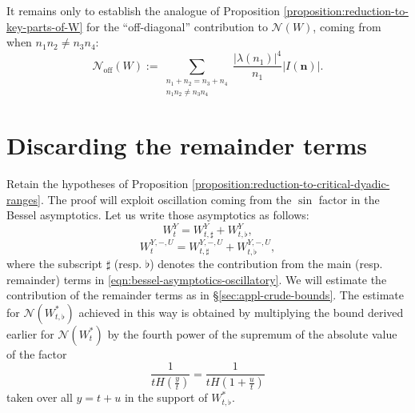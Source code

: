 \documentclass[reqno]{amsart} 
\begin{document}
It remains only to establish the analogue of Proposition \ref{proposition:reduction-to-key-parts-of-W} for the ``off-diagonal'' contribution to $\mathcal{N}(W)$, coming from when $n_1 n_2 \neq n_3 n_4$:
\begin{equation}\label{eqn:definition-N-off}
  \mathcal{N}_{\mathrm{off}}(W) := \sum _{
    \substack{
      n_1 + n_2 = n_3 + n_4  \\
      n_1 n_2 \neq n_3 n_4      
    }
  }
  \frac{\left\lvert \lambda (n _1 ) \right\rvert ^4 }{ n _1 } \left\lvert I(\mathbf{n}) \right\rvert.
\end{equation}



\section{Discarding the remainder terms}\label{sec:discarding-remainder-terms}
Retain the hypotheses of Proposition \ref{proposition:reduction-to-critical-dyadic-ranges}.  The proof will exploit oscillation coming from the $\sin$ factor in the Bessel asymptotics.  Let us write those asymptotics as follows:
\begin{equation*}
  W _t ^Y = W _{t,\sharp}^Y + W _{t,\flat}^Y,
\end{equation*}
\begin{equation*}
  W _t ^{Y, -, U} = W _{t, \sharp } ^{Y, -, U} + W _{t, \flat } ^{Y, -, U},
\end{equation*}
where the subscript $\sharp$ (resp. $\flat$) denotes the contribution from the main (resp. remainder) terms in \eqref{eqn:bessel-asymptotics-oscillatory}.  We will estimate the contribution of the remainder terms as in \S\ref{sec:appl-crude-bounds}.  The estimate for $\mathcal{N}(W_{t,\flat}^{\ast})$ achieved in this way is obtained by multiplying the bound derived earlier for $\mathcal{N} (W _{t} ^\ast )$ by the fourth power of the supremum of the absolute value of the factor
\begin{equation*}
  \frac{1}{t H (\tfrac{y}{t})} =   \frac{1}{t H (1 + \tfrac{u}{t})}
\end{equation*}
taken over all $y = t + u$ in the support of $W_{t,\flat}^*$.
\end{document}
